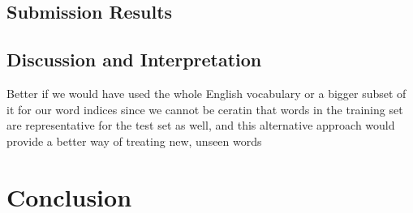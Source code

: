 \documentclass[11pt,a4paper]{article}
\begin{document}
\subsection{Submission Results}

\subsection{Discussion and Interpretation}

Better if we would have used the whole English vocabulary or a bigger subset of it for our word indices since we cannot be ceratin that words in the training set are representative for the test set as well, and this alternative approach would provide a better way of treating new, unseen words

\section{Conclusion}
\end{document}
